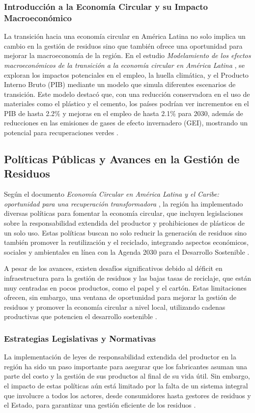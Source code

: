 \documentclass[main.tex]{subfiles}
\begin{document}
\subsubsection{Introducción a la Economía Circular y su Impacto Macroeconómico}
La transición hacia una economía circular en América Latina no solo implica un cambio en la gestión de residuos sino que también ofrece una oportunidad para mejorar la macroeconomía de la región. En el estudio \textit{Modelamiento de los efectos macroeconómicos de la transición a la economía circular en América Latina} \cite{rodriguez2023modelamiento}, se exploran los impactos potenciales en el empleo, la huella climática, y el Producto Interno Bruto (PIB) mediante un modelo que simula diferentes escenarios de transición. Este modelo destacó que, con una reducción conservadora en el uso de materiales como el plástico y el cemento, los países podrían ver incrementos en el PIB de hasta 2.2\% y mejoras en el empleo de hasta 2.1\% para 2030, además de reducciones en las emisiones de gases de efecto invernadero (GEI), mostrando un potencial para recuperaciones verdes \cite{rodriguez2023modelamiento}.

\subsection{Políticas Públicas y Avances en la Gestión de Residuos}
Según el documento \textit{Economía Circular en América Latina y el Caribe: oportunidad para una recuperación transformadora} \cite{cepal2021economia}, la región ha implementado diversas políticas para fomentar la economía circular, que incluyen legislaciones sobre la responsabilidad extendida del productor y prohibiciones de plásticos de un solo uso. Estas políticas buscan no solo reducir la generación de residuos sino también promover la reutilización y el reciclado, integrando aspectos económicos, sociales y ambientales en línea con la Agenda 2030 para el Desarrollo Sostenible \cite{cepal2021economia}.

A pesar de los avances, existen desafíos significativos debido al déficit en infraestructura para la gestión de residuos y las bajas tasas de reciclaje, que están muy centradas en pocos productos, como el papel y el cartón. Estas limitaciones ofrecen, sin embargo, una ventana de oportunidad para mejorar la gestión de residuos y promover la economía circular a nivel local, utilizando cadenas productivas que potencien el desarrollo sostenible \cite{cepal2021economia}.

\subsubsection{Estrategias Legislativas y Normativas}
La implementación de leyes de responsabilidad extendida del productor en la región ha sido un paso importante para asegurar que los fabricantes asuman una parte del costo y la gestión de sus productos al final de su vida útil. Sin embargo, el impacto de estas políticas aún está limitado por la falta de un sistema integral que involucre a todos los actores, desde consumidores hasta gestores de residuos y el Estado, para garantizar una gestión eficiente de los residuos \cite{cepal2021economia}.
\end{document}
